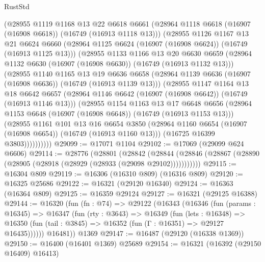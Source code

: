 \begin{lexlean}{RustStd}
\begin{coremodule}
        (@28955
          @1119
          @1168
          @13
          @22
          @6618
          @6661
          (@28964 @1118 @6618 (@16907 (@16908 @6618)) (@16749 (@16913 @1118 @13)))
          (@28955
            @1126
            @1167
            @13
            @21
            @6624
            @6660
            (@28964 @1125 @6624 (@16907 (@16908 @6624)) (@16749 (@16913 @1125 @13)))
            (@28955
              @1133
              @1166
              @13
              @20
              @6630
              @6659
              (@28964 @1132 @6630 (@16907 (@16908 @6630)) (@16749 (@16913 @1132 @13)))
              (@28955
                @1140
                @1165
                @13
                @19
                @6636
                @6658
                (@28964 @1139 @6636 (@16907 (@16908 @6636)) (@16749 (@16913 @1139 @13)))
                (@28955
                  @1147
                  @1164
                  @13
                  @18
                  @6642
                  @6657
                  (@28964 @1146 @6642 (@16907 (@16908 @6642)) (@16749 (@16913 @1146 @13)))
                  (@28955
                    @1154
                    @1163
                    @13
                    @17
                    @6648
                    @6656
                    (@28964 @1153 @6648 (@16907 (@16908 @6648)) (@16749 (@16913 @1153 @13)))
                    (@28955
                      @1161
                      @101
                      @13
                      @16
                      @6654
                      @3850
                      (@28964 @1160 @6654 (@16907 (@16908 @6654)) (@16749 (@16913 @1160 @13)))
                      (@16725 @16399 @3803))))))))))
@29099 := @17071 @1104
@29102 := @17069 (@29099 @624 @6606)
@29114 := @28776
    (@28801
      (@28842
        (@28844 (@28846 (@28867 (@28890 (@28905 (@28918 (@28929 (@28933 (@29098 @29102)))))))))))
@29115 := @16304 @809
@29119 := @16306 (@16310 @809) (@16316 @809)
@29120 := @16325 @25686
@29122 := @16321 (@29120 @16340)
@29124 := @16363 (@16364 @809)
@29125 := @16359 @29124
@29127 := @16321 (@29125 @16388)
@29144 := @16320
    (fun (fn : @74) =>
    @29122
      (@16343
        (@16346
          (fun (params : @16345) =>
          @16347
            (fun (rty : @3643) =>
            @16349
              (fun (lets : @16348) =>
              @16350 (fun (tail : @3845) => @16352 (fun (Γ : @16351) => @29127 @16435))))))
        @16481))
    @1369
@29147 := @16487 (@29120 (@16338 @1369))
@29150 := @16400 (@16401 @1369) @25689
@29154 := @16321 (@16392 (@29150 @16409) @16413)

\end{coremodule}
\end{lexlean}
